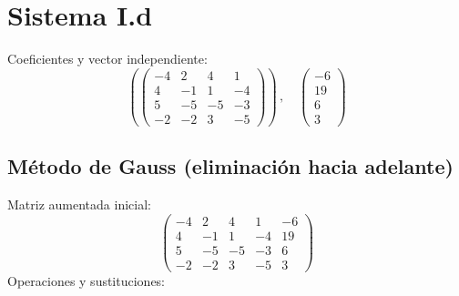\documentclass{article}
\begin{document}
\section*{Sistema I.d}
Coeficientes y vector independiente:
\[\left( \begin{pmatrix}-4 & 2 & 4 & 1 \\ 4 & -1 & 1 & -4 \\ 5 & -5 & -5 & -3 \\ -2 & -2 & 3 & -5\end{pmatrix}\right) \,, \quad \begin{pmatrix}-6 \\ 19 \\ 6 \\ 3\end{pmatrix}\]
\subsection*{Método de Gauss (eliminación hacia adelante)}
Matriz aumentada inicial:
\[\begin{pmatrix}-4 & 2 & 4 & 1 & -6 \\ 4 & -1 & 1 & -4 & 19 \\ 5 & -5 & -5 & -3 & 6 \\ -2 & -2 & 3 & -5 & 3\end{pmatrix}\]
Operaciones y sustituciones:
\end{document}
